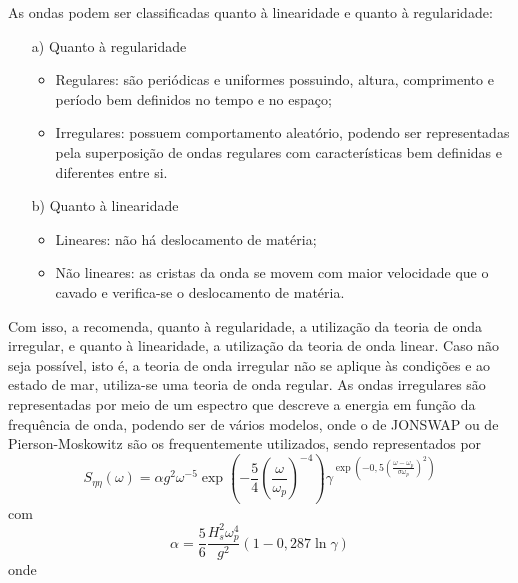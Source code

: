 As ondas podem ser classificadas quanto à linearidade e quanto à regularidade:
\begin{itemize}
	\item[a)] Quanto à regularidade
	\begin{itemize}
		\item Regulares: são periódicas e uniformes possuindo, altura, comprimento e período bem definidos no tempo e no espaço;

		\item Irregulares: possuem comportamento aleatório, podendo ser representadas pela superposição de ondas regulares com características bem definidas e diferentes entre si.
	\end{itemize}
	
	\item[b)] Quanto à linearidade
	
	\begin{itemize}
		\item Lineares: não há deslocamento de matéria;
		\item Não lineares: as cristas da onda se movem com maior velocidade que o cavado e verifica-se o deslocamento de matéria.
	\end{itemize}
\end{itemize}

Com isso, a  recomenda, quanto à regularidade, a utilização da teoria de onda irregular, e quanto à linearidade, a utilização da teoria de onda linear. Caso não seja possível, isto é, a teoria de onda irregular não se aplique às condições e ao estado de mar, utiliza-se uma teoria de onda regular.
As ondas irregulares são representadas por meio de um espectro que descreve a energia em função da frequência de onda, podendo ser de vários modelos, onde o de JONSWAP ou de Pierson-Moskowitz são os frequentemente utilizados, sendo representados por \cite{DNV2017}
\begin{equation}
\label{eq:jdsn-eq2}
S_{\eta\eta}(\omega) = \alpha g^2 \omega^{-5} \exp\left(-\frac{5}{4}\left(\frac{\omega}{\omega_p}\right)^{-4}\right)\gamma^{\exp \left(-0,5\left(\frac{\omega-\omega_p}{\sigma \omega_p}\right)^2\right)}
\end{equation}
com
\begin{equation}
\label{eq:jdsn-eq3}
\alpha = \frac{5}{6} \frac{H_s^2 \omega_p^4}{g^2} \left(1- 0,287 \ln{\gamma}\right)
\end{equation}
onde

